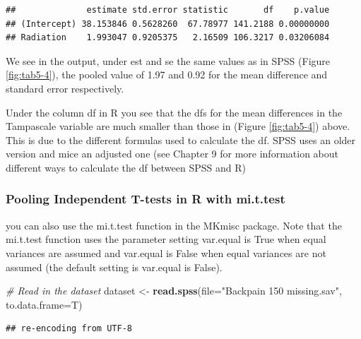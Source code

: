 \documentclass[]{book}
\newenvironment{Shaded}{\begin{snugshade}}{\end{snugshade}}
\newcommand{\KeywordTok}[1]{\textcolor[rgb]{0.13,0.29,0.53}{\textbf{#1}}}
\newcommand{\DataTypeTok}[1]{\textcolor[rgb]{0.13,0.29,0.53}{#1}}
\newcommand{\StringTok}[1]{\textcolor[rgb]{0.31,0.60,0.02}{#1}}
\newcommand{\CommentTok}[1]{\textcolor[rgb]{0.56,0.35,0.01}{\textit{#1}}}
\newcommand{\NormalTok}[1]{#1}
\theoremstyle{definition}
\theoremstyle{definition}
\theoremstyle{definition}
\theoremstyle{remark}
\begin{document}
\begin{verbatim}
##              estimate std.error statistic       df    p.value
## (Intercept) 38.153846 0.5628260  67.78977 141.2188 0.00000000
## Radiation    1.993047 0.9205375   2.16509 106.3217 0.03206084
\end{verbatim}

We see in the output, under est and se the same values as in SPSS
(Figure \ref{fig:tab5-4}), the pooled value of 1.97 and 0.92 for the
mean difference and standard error respectively.

Under the column df in R you see that the dfs for the mean differences
in the Tampascale variable are much smaller than those in (Figure
\ref{fig:tab5-4}) above. This is due to the different formulas used to
calculate the df. SPSS uses an older version and mice an adjusted one
(see Chapter 9 for more information about different ways to calculate
the df between SPSS and R)

\subsubsection{Pooling Independent T-tests in R with
mi.t.test}\label{pooling-independent-t-tests-in-r-with-mi.t.test}

you can also use the mi.t.test function in the MKmisc package. Note that
the mi.t.test function uses the parameter setting var.equal is True when
equal variances are assumed and var.equal is False when equal variances
are not assumed (the default setting is var.equal is False).

\begin{Shaded}
\begin{Highlighting}[]
\CommentTok{# Read in the dataset}
\NormalTok{dataset <-}\StringTok{ }\KeywordTok{read.spss}\NormalTok{(}\DataTypeTok{file=}\StringTok{"Backpain 150 missing.sav"}\NormalTok{, }\DataTypeTok{to.data.frame=}\NormalTok{T)}
\end{Highlighting}
\end{Shaded}

\begin{verbatim}
## re-encoding from UTF-8
\end{verbatim}
\end{document}
